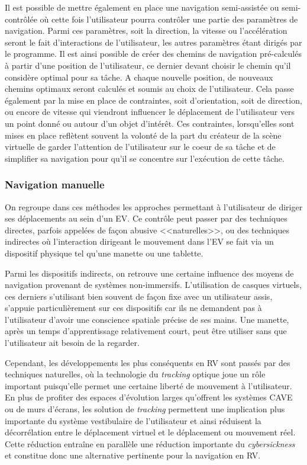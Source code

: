 Il est possible de mettre également en place une navigation semi-assistée ou semi-contrôlée où cette fois l'utilisateur pourra contrôler une partie des paramètres de navigation. Parmi ces paramètres, soit la direction, la vitesse ou l'accélération seront le fait d'interactions de l'utilisateur, les autres paramètres étant dirigés par le programme. Il est ainsi possible de créer des chemins de navigation pré-calculés à partir d'une position de l'utilisateur, ce dernier devant choisir le chemin qu'il considère optimal pour sa tâche. A chaque nouvelle position, de nouveaux chemins optimaux seront calculés et soumis au choix de l'utilisateur.
Cela passe également par la mise en place de contraintes, soit d'orientation, soit de direction, ou encore de vitesse qui viendront influencer le déplacement de l'utilisateur vers un point donné ou autour d'un objet d'intérêt. Ces contraintes, lorsqu'elles sont mises en place reflètent souvent la volonté de la part du créateur de la scène virtuelle de garder l'attention de l'utilisateur sur le coeur de sa tâche et de simplifier sa navigation pour qu'il se concentre sur l’exécution de cette tâche.

\subsubsection{Navigation manuelle}

On regroupe dans ces méthodes les approches permettant à l'utilisateur de diriger ses déplacements au sein d'un EV. Ce contrôle peut passer par des techniques directes, parfois appelées de façon abusive <<naturelles>>, ou des techniques indirectes où l'interaction dirigeant le mouvement dans l'EV se fait via un dispositif physique tel qu'une manette ou une tablette.

Parmi les dispositifs indirects, on retrouve une certaine influence des moyens de navigation provenant de systèmes non-immersifs. L'utilisation de casques virtuels, ces derniers s'utilisant bien souvent de façon fixe avec un utilisateur assis, s'appuie particulièrement sur ces dispositifs car ils ne demandent pas à l'utilisateur d'avoir une conscience spatiale précise de ses mains. Une manette, après un temps d'apprentissage relativement court, peut être utiliser sans que l'utilisateur ait besoin de la regarder. 

Cependant, les développements les plus conséquents en RV sont passés par des techniques naturelles, où la technologie du \textit{tracking} optique joue un rôle important puisqu'elle permet une certaine liberté de mouvement à l'utilisateur. En plus de profiter des espaces d'évolution larges qu'offrent les systèmes CAVE ou de murs d'écrans, les solution de \textit{tracking} permettent une implication plus importante du système vestibulaire de l'utilisateur et ainsi réduisent la décorrélation entre le déplacement virtuel et le déplacement ou mouvement réel. Cette réduction entraîne en parallèle une réduction importante du \textit{cybersickness} et constitue donc une alternative pertinente pour la navigation en RV.

